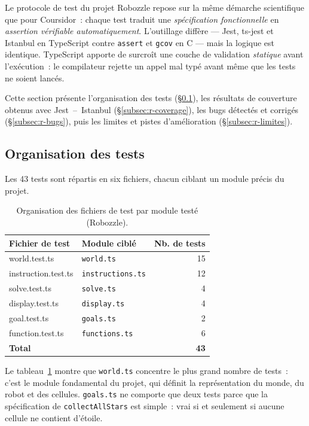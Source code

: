 \documentclass[12pt,a4paper]{article}
\begin{document}
Le protocole de test du projet Robozzle repose sur la même démarche
scientifique que pour Coursidor~: chaque test traduit une
\emph{spécification fonctionnelle} en \emph{assertion vérifiable
automatiquement}. L'outillage diffère — Jest, ts-jest et Istanbul
en TypeScript contre \texttt{assert} et \texttt{gcov} en C — mais la
logique est identique. TypeScript apporte de surcroît une couche de
validation \emph{statique} avant l'exécution~: le compilateur rejette
un appel mal typé avant même que les tests ne soient lancés.

Cette section présente l'organisation des tests
(\S\ref{subsec:r-orga}), les résultats de couverture obtenus avec
Jest~--~Istanbul (\S\ref{subsec:r-coverage}), les bugs détectés et
corrigés (\S\ref{subsec:r-bugs}), puis les limites et pistes
d'amélioration (\S\ref{subsec:r-limites}).

\subsection{Organisation des tests}
\label{subsec:r-orga}
 
Les 43 tests sont répartis en six fichiers, chacun ciblant un module
précis du projet.
 
\begin{table}[h!]
\centering
\renewcommand{\arraystretch}{1.3}
\begin{tabular}{>{\ttfamily}l l r}
\toprule
\normalfont Fichier de test & Module ciblé & Nb. de tests \\
\midrule
world.test.ts       & \texttt{world.ts}        & 15 \\
instruction.test.ts & \texttt{instructions.ts} & 12 \\
solve.test.ts       & \texttt{solve.ts}        & 4  \\
display.test.ts     & \texttt{display.ts}      & 4  \\
goal.test.ts        & \texttt{goals.ts}        & 2  \\
function.test.ts    & \texttt{functions.ts}    & 6  \\
\midrule
\textbf{Total}      &                          & \textbf{43} \\
\bottomrule
\end{tabular}
\caption{Organisation des fichiers de test par module testé (Robozzle).}
\label{tab:r-modules}
\end{table}
 
Le tableau~\ref{tab:r-modules} montre que \texttt{world.ts} concentre
le plus grand nombre de tests~: c'est le module fondamental du projet,
qui définit la représentation du monde, du robot et des cellules.
\texttt{goals.ts} ne comporte que deux tests parce que la spécification
de \texttt{collectAllStars} est simple~: vrai si et seulement si aucune
cellule ne contient d'étoile.
\end{document}
